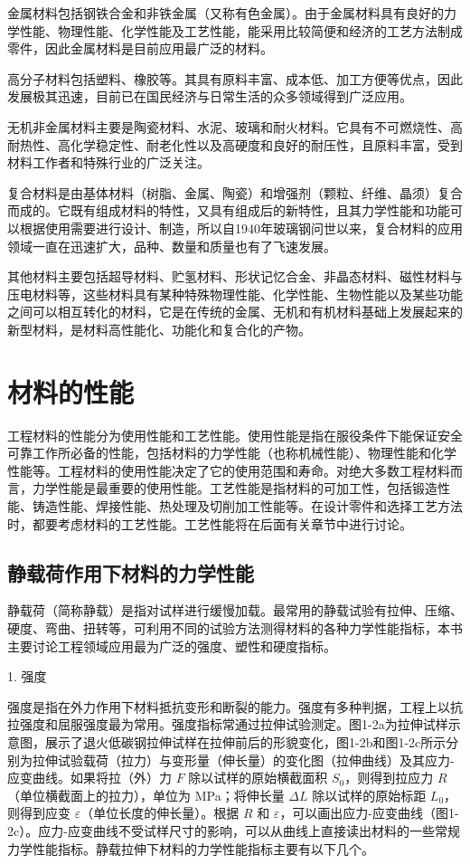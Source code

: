 \documentclass[UTF8]{ctexbook}
\newcommand{\◎}{\ensuremath{\bigcirc}}
\begin{document}
金属材料包括钢铁合金和非铁金属（又称有色金属）。由于金属材料具有良好的力学性能、物理性能、化学性能及工艺性能，能采用比较简便和经济的工艺方法制成零件，因此金属材料是目前应用最广泛的材料。

高分子材料包括塑料、橡胶等。其具有原料丰富、成本低、加工方便等优点，因此发展极其迅速，目前已在国民经济与日常生活的众多领域得到广泛应用。

无机非金属材料主要是陶瓷材料、水泥、玻璃和耐火材料。它具有不可燃烧性、高耐热性、高化学稳定性、耐老化性以及高硬度和良好的耐压性，且原料丰富，受到材料工作者和特殊行业的广泛关注。

复合材料是由基体材料（树脂、金属、陶瓷）和增强剂（颗粒、纤维、晶须）复合而成的。它既有组成材料的特性，又具有组成后的新特性，且其力学性能和功能可以根据使用需要进行设计、制造，所以自1940年玻璃钢问世以来，复合材料的应用领域一直在迅速扩大，品种、数量和质量也有了飞速发展。

其他材料主要包括超导材料、贮氢材料、形状记忆合金、非晶态材料、磁性材料与压电材料等，这些材料具有某种特殊物理性能、化学性能、生物性能以及某些功能之间可以相互转化的材料，它是在传统的金属、无机和有机材料基础上发展起来的新型材料，是材料高性能化、功能化和复合化的产物。

\section{材料的性能}

工程材料的性能分为使用性能和工艺性能。使用性能是指在服役条件下能保证安全可靠工作所必备的性能，包括材料的力学性能（也称机械性能）、物理性能和化学性能等。工程材料的使用性能决定了它的使用范围和寿命。对绝大多数工程材料而言，力学性能是最重要的使用性能。工艺性能是指材料的可加工性，包括锻造性能、铸造性能、焊接性能、热处理及切削加工性能等。在设计零件和选择工艺方法时，都要考虑材料的工艺性能。工艺性能将在后面有关章节中进行讨论。

\subsection{静载荷作用下材料的力学性能}

静载荷（简称静载）是指对试样进行缓慢加载。最常用的静载试验有拉伸、压缩、硬度、弯曲、扭转等，可利用不同的试验方法测得材料的各种力学性能指标，本书主要讨论工程领域应用最为广泛的强度、塑性和硬度指标。

1. 强度

强度是指在外力作用下材料抵抗变形和断裂的能力。强度有多种判据，工程上以抗拉强度和屈服强度最为常用。强度指标常通过拉伸试验测定。图1-2a为拉伸试样示意图，展示了退火低碳钢拉伸试样在拉伸前后的形貌变化，图1-2b和图1-2c所示分别为拉伸试验载荷（拉力）与变形量（伸长量）的变化图（拉伸曲线）及其应力-应变曲线。如果将拉（外）力 $F$ 除以试样的原始横截面积 $S_0$，则得到拉应力 $R$（单位横截面上的拉力），单位为 MPa；将伸长量 $\Delta L$ 除以试样的原始标距 $L_0$，则得到应变 $\varepsilon$（单位长度的伸长量）。根据 $R$ 和 $\varepsilon$，可以画出应力-应变曲线（图1-2c）。应力-应变曲线不受试样尺寸的影响，可以从曲线上直接读出材料的一些常规力学性能指标。静载拉伸下材料的力学性能指标主要有以下几个。
\end{document}
